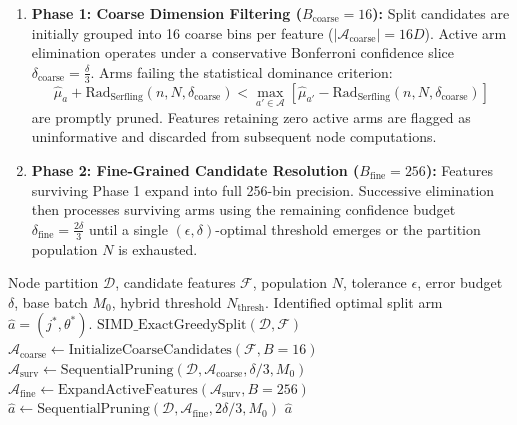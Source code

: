 \begin{enumerate}
    \item \textbf{Phase 1: Coarse Dimension Filtering ($B_{\text{coarse}} = 16$):} Split candidates are initially grouped into 16 coarse bins per feature ($|\mathcal{A}_{\text{coarse}}| = 16 D$). Active arm elimination operates under a conservative Bonferroni confidence slice $\delta_{\text{coarse}} = \frac{\delta}{3}$. Arms failing the statistical dominance criterion:
    \begin{equation}
    \hat{\mu}_a + \text{Rad}_{\text{Serfling}}(n, N, \delta_{\text{coarse}}) < \max_{a' \in \mathcal{A}} \left[ \hat{\mu}_{a'} - \text{Rad}_{\text{Serfling}}(n, N, \delta_{\text{coarse}}) \right]
    \end{equation}
    are promptly pruned. Features retaining zero active arms are flagged as uninformative and discarded from subsequent node computations.
    \item \textbf{Phase 2: Fine-Grained Candidate Resolution ($B_{\text{fine}} = 256$):} Features surviving Phase 1 expand into full 256-bin precision. Successive elimination then processes surviving arms using the remaining confidence budget $\delta_{\text{fine}} = \frac{2\delta}{3}$ until a single $(\epsilon, \delta)$-optimal threshold emerges or the partition population $N$ is exhausted.
\end{enumerate}

\begin{algorithm}[htbp]
\caption{MABSplit Node Induction Procedure via Serfling Bounds and ADMA Scheduling}
\label{alg:mabsplit}
\begin{algorithmic}[1]
\REQUIRE Node partition $\mathcal{D}$, candidate features $\mathcal{F}$, population $N$, tolerance $\epsilon$, error budget $\delta$, base batch $M_0$, hybrid threshold $N_{\text{thresh}}$.
\ENSURE Identified optimal split arm $\hat{a} = (j^*, \theta^*)$.
    \RETURN $\text{SIMD\_ExactGreedySplit}(\mathcal{D}, \mathcal{F})$ 
\ENDIF
\STATE $\mathcal{A}_{\text{coarse}} \leftarrow \text{InitializeCoarseCandidates}(\mathcal{F}, B=16)$
\STATE $\mathcal{A}_{\text{surv}} \leftarrow \text{SequentialPruning}(\mathcal{D}, \mathcal{A}_{\text{coarse}}, \delta/3, M_0)$
\STATE $\mathcal{A}_{\text{fine}} \leftarrow \text{ExpandActiveFeatures}(\mathcal{A}_{\text{surv}}, B=256)$
\STATE $\hat{a} \leftarrow \text{SequentialPruning}(\mathcal{D}, \mathcal{A}_{\text{fine}}, 2\delta/3, M_0)$
\RETURN $\hat{a}$
\end{algorithmic}
\end{algorithm}

